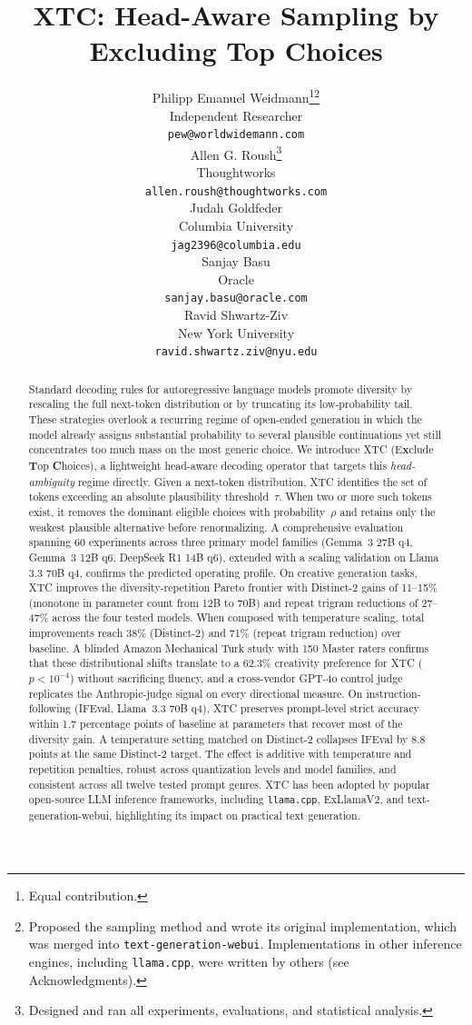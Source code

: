 \documentclass{article}
\title{XTC: Head-Aware Sampling by Excluding Top Choices}
\author{%
  Philipp Emanuel Weidmann\thanks{Equal contribution.}\thanks{Proposed the \xtc{} sampling method and wrote its original implementation, which was merged into \texttt{text-generation-webui}. Implementations in other inference engines, including \texttt{llama.cpp}, were written by others (see Acknowledgments).} \\
  Independent Researcher \\
  \texttt{pew@worldwidemann.com} \\
  \And
  Allen G. Roush\footnotemark[1]\thanks{Designed and ran all experiments, evaluations, and statistical analysis.} \\
  Thoughtworks \\
  \texttt{allen.roush@thoughtworks.com} \\
  \AND
  Judah Goldfeder \\
  Columbia University \\
  \texttt{jag2396@columbia.edu} \\
  \And
  Sanjay Basu \\
  Oracle \\
  \texttt{sanjay.basu@oracle.com} \\
  \And
  Ravid Shwartz-Ziv \\
  New York University \\
  \texttt{ravid.shwartz.ziv@nyu.edu} \\
}
\newcommand{\xtc}{\textsc{XTC}}
\begin{document}
\maketitle

\begin{abstract}
Standard decoding rules for autoregressive language models promote diversity by rescaling the full next-token distribution or by truncating its low-probability tail.
These strategies overlook a recurring regime of open-ended generation in which the model already assigns substantial probability to several plausible continuations yet still concentrates too much mass on the most generic choice.
We introduce \xtc{} (E\textbf{x}clude \textbf{T}op \textbf{C}hoices), a lightweight head-aware decoding operator that targets this \emph{head-ambiguity} regime directly.
Given a next-token distribution, \xtc{} identifies the set of tokens exceeding an absolute plausibility threshold~$\tau$.
When two or more such tokens exist, it removes the dominant eligible choices with probability~$\rho$ and retains only the weakest plausible alternative before renormalizing.
A comprehensive evaluation spanning 60 experiments across three primary model families (Gemma~3 27B q4, Gemma~3 12B q6, DeepSeek R1 14B q6), extended with a scaling validation on Llama 3.3 70B q4, confirms the predicted operating profile.
On creative generation tasks, \xtc{} improves the diversity-repetition Pareto frontier with Distinct-2 gains of 11--15\% (monotone in parameter count from 12B to 70B) and repeat trigram reductions of 27--47\% across the four tested models.
When composed with temperature scaling, total improvements reach 38\% (Distinct-2) and 71\% (repeat trigram reduction) over baseline.
A blinded Amazon Mechanical Turk study with 150 Master raters confirms that these distributional shifts translate to a 62.3\% creativity preference for \xtc{} ($p<10^{-4}$) without sacrificing fluency, and a cross-vendor GPT-4o control judge replicates the Anthropic-judge signal on every directional measure.
On instruction-following (IFEval, Llama~3.3 70B q4), \xtc{} preserves prompt-level strict accuracy within 1.7 percentage points of baseline at parameters that recover most of the diversity gain. A temperature setting matched on Distinct-2 collapses IFEval by 8.8 points at the same Distinct-2 target.
The effect is additive with temperature and repetition penalties, robust across quantization levels and model families, and consistent across all twelve tested prompt genres. XTC has been adopted by popular open-source LLM inference
frameworks, including \texttt{llama.cpp}, ExLlamaV2, and
text-generation-webui, highlighting its impact on practical text
generation.
\end{abstract}
\end{document}
